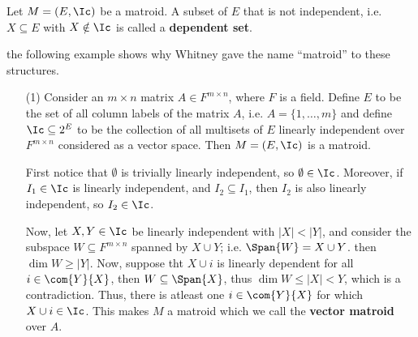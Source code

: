 \begin{definition}
    Let $M=(E,\Ic)$ be a matroid. A subset of $E$ that is not independent, i.e.
    $X \subseteq E$ with  $X \notin \Ic$ is called a \textbf{dependent set}.
\end{definition}

the following example shows why Whitney gave the name ``matroid'' to these
structures.

\begin{example}\label{1.4}
    \begin{enumerate}
        \item[(1)] Consider an $m \times n$ matrix  $A \in F^{m \times n}$,
            where $F$ is a field. Define $E$ to  be the set of all column labels
            of the matrix $A$, i.e.  $A=\{1, \dots, m\}$ and define $\Ic
            \subseteq 2^E$ to be the collection of all multisets of $E$
            linearly independent over $F^{m \times n}$ considered as a vector
            space. Then $M=(E,\Ic)$ is a matroid.

            First notice that $\emptyset$ is trivially linearly independent, so
             $\emptyset \in \Ic$. Moreover, if $I_1 \in \Ic$ is linearly
             independent, and $I_2 \subseteq I_1$, then $I_2$ is also linearly
             independent, so  $I_2 \in \Ic$.

             Now, let $X,Y \in \Ic$ be linearly independent with $|X|<|Y|$, and
             consider the subspace $W \subseteq F^{m \times n}$ spanned by $X
             \cup Y$; i.e. $\Span{W}=X \cup Y$. then $\dim{W} \geq |Y|$. Now,
             suppose tht $X \cup i$ is linearly dependent for all  $i \in
             \com{Y}{X}$, then $W \subseteq \Span{X}$, thus $\dim{W} \leq
             |X|<Y$, which is a contradiction. Thus, there is atleast one $i \in
             \com{Y}{X}$ for which $X \cup i \in \Ic$. This makes $M$ a matroid
             which we call the  \textbf{vector matroid} over $A$.


\end{enumerate}
\end{example}

